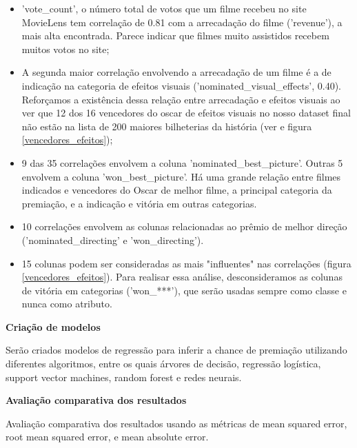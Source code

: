             \begin{itemize}

            \item 'vote\_count', o número total de votos que um filme recebeu no site MovieLens tem correlação de 0.81 com a arrecadação do filme ('revenue'), a mais alta encontrada. Parece indicar que filmes muito assistidos recebem muitos votos no site;

            \item A segunda maior correlação envolvendo a arrecadação de um filme é a de indicação na categoria de efeitos visuais ('nominated\_visual\_effects', 0.40). Reforçamos a existência dessa relação entre arrecadação e efeitos visuais ao ver que 12 dos 16 vencedores do oscar de efeitos visuais no nosso dataset final não estão na lista de 200 maiores bilheterias da história (ver  e figura \ref{vencedores_efeitos});

            \item 9 das 35 correlações envolvem a coluna 'nominated\_best\_picture'. Outras 5 envolvem a coluna 'won\_best\_picture'. Há uma grande relação entre filmes indicados e vencedores do Oscar de melhor filme, a principal categoria da premiação, e a indicação e vitória em outras categorias.

            \item 10 correlações envolvem as colunas relacionadas ao prêmio de melhor direção ('nominated\_directing' e 'won\_directing').

            \item 15 colunas podem ser consideradas as mais "influentes" nas correlações (figura \ref{vencedores_efeitos}). Para realisar essa análise, desconsideramos as colunas de vitória em categorias ('won\_***'), que serão usadas sempre como classe e nunca como atributo.

            \end{itemize}

            \textbf{Criação de modelos}\par
            Serão criados modelos de regressão para inferir a chance de premiação utilizando diferentes algoritmos, entre os quais árvores de decisão, regressão logística, support vector machines, random forest e redes neurais.\newline

            \textbf{Avaliação comparativa dos resultados}\par
            Avaliação comparativa dos resultados usando as métricas de mean squared error, root mean squared error, e mean absolute error.\newline

